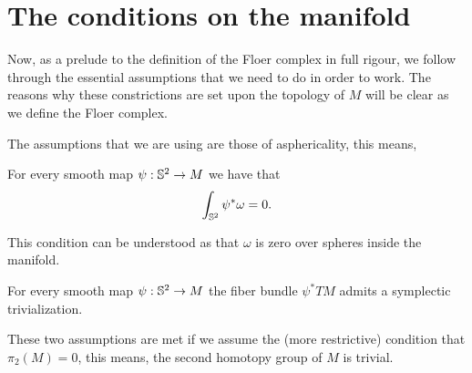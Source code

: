 \section{The conditions on the manifold}

Now, as a prelude to the definition of the Floer complex in full rigour, we follow through the essential assumptions that we need to do in order to work. The reasons why these constrictions are set upon the topology of $M$ will be clear as we define the Floer complex.

The assumptions that we are using are those of asphericality, this means,

\begin{assump} \label{assumption1}
For every smooth map $\psi : \mathbb{S}^2 \rightarrow M$ we have that
$$\int_{\mathbb{S}^2} \psi^{\ast} \omega = 0 .$$
\end{assump}

This condition can be understood as that $\omega$ is zero over spheres inside the manifold.

\begin{assump} \label{assumption2}
For every smooth map $\psi : \mathbb{S}^2 \rightarrow M$ the fiber bundle $\psi^{\ast} TM$ admits a symplectic trivialization.
\end{assump}

These two assumptions are met if we assume the (more restrictive) condition that $\pi_2(M) = 0$, this means, the second homotopy group of $M$ is trivial.
